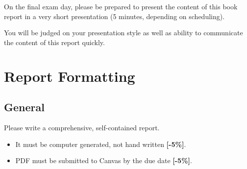 \documentclass{article}
\begin{document}
On the final exam day, please be prepared to present the content of 
this book report in a very short presentation (5 minutes, depending on 
scheduling). 

You will be judged on your presentation style as well as ability 
to communicate the content of this report quickly.

\section{Report Formatting}
\subsection{General}
Please write a comprehensive, self-contained report.
                \begin{itemize}
                        \item It must be computer generated, not hand written 
                                {\color{red}\textbf{[-5\%]}}.
                        \item PDF must be submitted to Canvas by 
                                the due date  {\color{red}\textbf{[-5\%]}}.
                \end{itemize}
\end{document}
